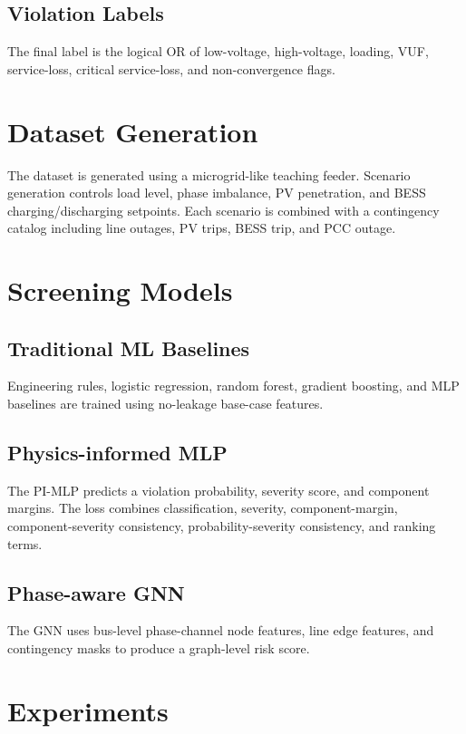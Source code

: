 \documentclass[conference]{IEEEtran}
\begin{document}
\subsection{Violation Labels}
The final label is the logical OR of low-voltage, high-voltage, loading, VUF, service-loss, critical service-loss, and non-convergence flags.

\section{Dataset Generation}
The dataset is generated using a microgrid-like teaching feeder. Scenario generation controls load level, phase imbalance, PV penetration, and BESS charging/discharging setpoints. Each scenario is combined with a contingency catalog including line outages, PV trips, BESS trip, and PCC outage.



\section{Screening Models}
\subsection{Traditional ML Baselines}
Engineering rules, logistic regression, random forest, gradient boosting, and MLP baselines are trained using no-leakage base-case features.

\subsection{Physics-informed MLP}
The PI-MLP predicts a violation probability, severity score, and component margins. The loss combines classification, severity, component-margin, component-severity consistency, probability-severity consistency, and ranking terms.

\subsection{Phase-aware GNN}
The GNN uses bus-level phase-channel node features, line edge features, and contingency masks to produce a graph-level risk score.

\section{Experiments}



\end{document}
